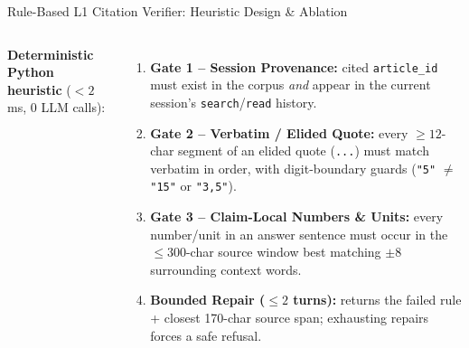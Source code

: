 \documentclass[aspectratio=1610,11pt]{beamer}
\begin{document}
\begin{frame}{Rule-Based L1 Citation Verifier: Heuristic Design \& Ablation}
  \begin{columns}[T]
    \scriptsize
    \textbf{Deterministic Python heuristic} ($<2$\,ms, 0 LLM calls):
    \vspace{2pt}
    \begin{enumerate}\scriptsize
      \item \textbf{Gate 1 -- Session Provenance:} cited \texttt{article\_id} must exist in the corpus \emph{and} appear in the current session's \texttt{search}/\texttt{read} history.
      \item \textbf{Gate 2 -- Verbatim / Elided Quote:} every $\ge 12$-char segment of an elided quote (\texttt{...}) must match verbatim in order, with digit-boundary guards (\texttt{"5"} $\neq$ \texttt{"15"} or \texttt{"3,5"}).
      \item \textbf{Gate 3 -- Claim-Local Numbers \& Units:} every number/unit in an answer sentence must occur in the $\le 300$-char source window best matching $\pm 8$ surrounding context words.
      \item \textbf{Bounded Repair ($\le 2$ turns):} returns the failed rule + closest 170-char source span; exhausting repairs forces a safe refusal.
    \end{enumerate}


\end{columns}
\end{frame}
\end{document}
